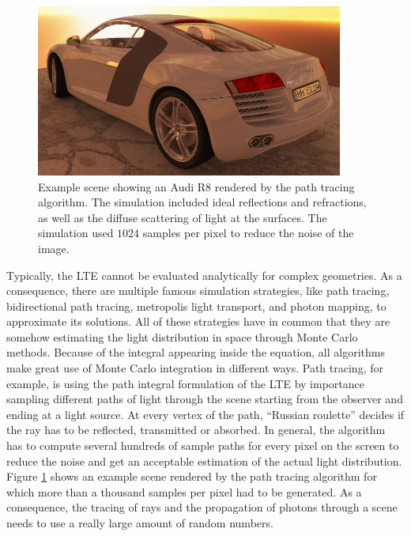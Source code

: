 \documentclass{stdlocal}
\begin{document}
    \begin{figure}
      \center
      \includegraphics[width=0.9\textwidth]{images/audi_r8_path_tracing.png}
      \caption[Path Tracing Example]{%
        Example scene showing an Audi R8 rendered by the path tracing algorithm.
        The simulation included ideal reflections and refractions, as well as the diffuse scattering of light at the surfaces.
        The simulation used $1024$ samples per pixel to reduce the noise of the image.
        \autocite{pawellek2017}
      }
      \label{fig:path-tracing-r8}
    \end{figure}

    Typically, the LTE cannot be evaluated analytically for complex geometries.
    As a consequence, there are multiple famous simulation strategies, like path tracing, bidirectional path tracing, metropolis light transport, and photon mapping, to approximate its solutions.
    All of these strategies have in common that they are somehow estimating the light distribution in space through Monte Carlo methods.
    Because of the integral appearing inside the equation, all algorithms make great use of Monte Carlo integration in different ways.
    Path tracing, for example, is using the path integral formulation of the LTE by importance sampling different paths of light through the scene starting from the observer and ending at a light source.
    At every vertex of the path, \enquote{Russian roulette} decides if the ray has to be reflected, transmitted or absorbed.
    In general, the algorithm has to compute several hundreds of sample paths for every pixel on the screen to reduce the noise and get an acceptable estimation  of the actual light distribution.
    Figure \ref{fig:path-tracing-r8} shows an example scene rendered by the path tracing algorithm for which more than a thousand samples per pixel had to be generated.
    As a consequence, the tracing of rays and the propagation of photons through a scene needs to use a really large amount of random numbers.
    \autocite{pharr2016}
\end{document}
